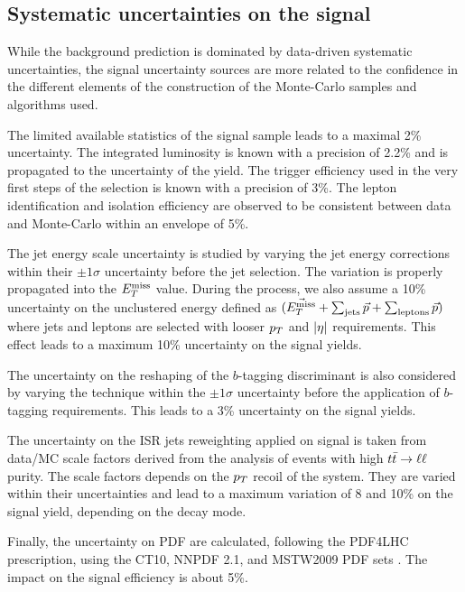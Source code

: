     \subsection{Systematic uncertainties on the signal}

    While the background prediction is dominated by data-driven systematic
    uncertainties, the signal uncertainty sources are more related to the
    confidence in the different elements of the construction of the Monte-Carlo
    samples and algorithms used.

    The limited available statistics of the signal sample leads to a maximal
    2\% uncertainty. The integrated luminosity is known with a precision of 2.2\%
    and is propagated to the uncertainty of the yield. The trigger efficiency
    used in the very first steps of the selection is known with a precision of 3\%.
    The lepton identification and isolation efficiency are observed to be consistent
    between data and Monte-Carlo within an envelope of 5\%.

    The jet energy scale uncertainty is studied by varying the jet energy corrections
    within their $\pm1\sigma$ uncertainty before the jet selection. The variation is
    properly propagated into the $E_T^\text{miss}$ value. During the process, we also assume a
    10\% uncertainty on the unclustered energy defined as $(\vec{E_T^\text{miss}} + \sum_\text{jets}
    \vec{p} + \sum_\text{leptons} \vec{p})$ where jets and leptons are selected with looser
    $p_T$ and $\left| \eta \right|$ requirements. This effect leads to a maximum 10\% uncertainty on
    the signal yields.

    The uncertainty on the reshaping of the $b$-tagging discriminant is also considered
    by varying the technique within the $\pm1\sigma$ uncertainty before the application of
    $b$-tagging requirements. This leads to a 3\% uncertainty on the signal yields.

    The uncertainty on the ISR jets reweighting applied on signal is taken from data/MC
    scale factors derived from the analysis of events with high $t\bar{t} \rightarrow \ell \ell$ purity. The
    scale factors depends on the $p_T$ recoil of the system. They are varied within their
    uncertainties and lead to a maximum variation of 8 and 10\% on the signal yield, depending
    on the decay mode.

    Finally, the uncertainty on PDF are calculated, following the PDF4LHC prescription,
    using the CT10, NNPDF 2.1, and MSTW2009 PDF sets \cite{PDF4LHC}. The impact on the
    signal efficiency is about 5\%.

